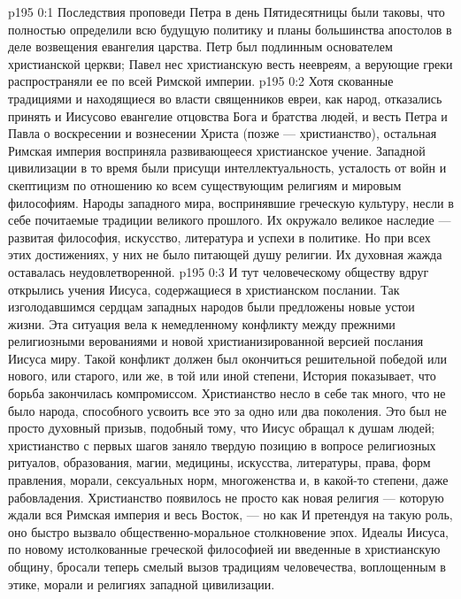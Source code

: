 \vs p195 0:1 Последствия проповеди Петра в день Пятидесятницы были таковы, что полностью определили всю будущую политику и планы большинства апостолов в деле возвещения евангелия царства. Петр был подлинным основателем христианской церкви; Павел нес христианскую весть неевреям, а верующие греки распространяли ее по всей Римской империи.
\vs p195 0:2 Хотя скованные традициями и находящиеся во власти священников евреи, как народ, отказались принять и Иисусово евангелие отцовства Бога и братства людей, и весть Петра и Павла о воскресении и вознесении Христа (позже --- христианство), остальная Римская империя восприняла развивающееся христианское учение. Западной цивилизации в то время были присущи интеллектуальность, усталость от войн и скептицизм по отношению ко всем существующим религиям и мировым философиям. Народы западного мира, воспринявшие греческую культуру, несли в себе почитаемые традиции великого прошлого. Их окружало великое наследие --- развитая философия, искусство, литература и успехи в политике. Но при всех этих достижениях, у них не было питающей душу религии. Их духовная жажда оставалась неудовлетворенной.
\vs p195 0:3 И тут человеческому обществу вдруг открылись учения Иисуса, содержащиеся в христианском послании. Так изголодавшимся сердцам западных народов были предложены новые устои жизни. Эта ситуация вела к немедленному конфликту между прежними религиозными верованиями и новой христианизированной версией послания Иисуса миру. Такой конфликт должен был окончиться решительной победой или нового, или старого, или же, в той или иной степени,  История показывает, что борьба закончилась компромиссом. Христианство несло в себе так много, что не было народа, способного усвоить все это за одно или два поколения. Это был не просто духовный призыв, подобный тому, что Иисус обращал к душам людей; христианство с первых шагов заняло твердую позицию в вопросе религиозных ритуалов, образования, магии, медицины, искусства, литературы, права, форм правления, морали, сексуальных норм, многоженства и, в какой\hyp{}то степени, даже рабовладения. Христианство появилось не просто как новая религия --- которую ждали вся Римская империя и весь Восток, --- но как  И претендуя на такую роль, оно быстро вызвало общественно\hyp{}моральное столкновение эпох. Идеалы Иисуса, по новому истолкованные греческой философией ии введенные в христианскую общину, бросали теперь смелый вызов традициям человечества, воплощенным в этике, морали и религиях западной цивилизации.
